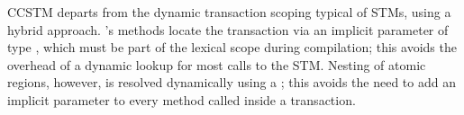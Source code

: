 
CCSTM departs from the dynamic transaction scoping typical of STMs, using
a hybrid approach.  's methods locate the transaction via an
implicit parameter of type , which must be part of the lexical
scope during compilation; this avoids the overhead of a dynamic lookup for
most calls to the STM.  Nesting of atomic regions, however, is resolved
dynamically using a ; this avoids the need to add an
implicit  parameter to every method called inside a transaction.


